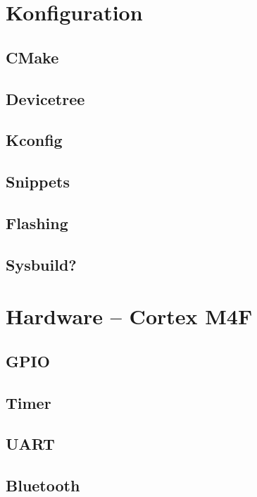 \section{Konfiguration}

\subsection{CMake}

\subsection{Devicetree}

\subsection{Kconfig}

\subsection{Snippets}

\subsection{Flashing}

\subsection{Sysbuild?}

\section{Hardware -- Cortex M4F}

\subsection{GPIO}

\subsection{Timer}

\subsection{UART}

\subsection{Bluetooth}


